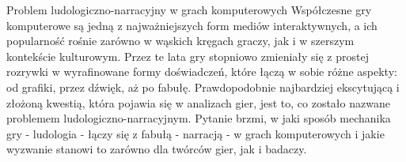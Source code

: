 \begin{frame}{Problem ludologiczno-narracyjny w grach komputerowych}
	Współczesne gry komputerowe są jedną z najważniejszych form mediów interaktywnych, a ich popularność rośnie zarówno w wąskich kręgach graczy, jak i w szerszym kontekście kulturowym. Przez te lata gry stopniowo zmieniały się z prostej rozrywki w wyrafinowane formy doświadczeń, które łączą w sobie różne aspekty: od grafiki, przez dźwięk, aż po fabułę. Prawdopodobnie najbardziej ekscytującą i złożoną kwestią, która pojawia się w analizach gier, jest to, co zostało nazwane problemem ludologiczno-narracyjnym. Pytanie brzmi, w jaki sposób mechanika gry - ludologia - łączy się z fabułą - narracją - w grach komputerowych i jakie wyzwanie stanowi to zarówno dla twórców gier, jak i badaczy.
\end{frame}
